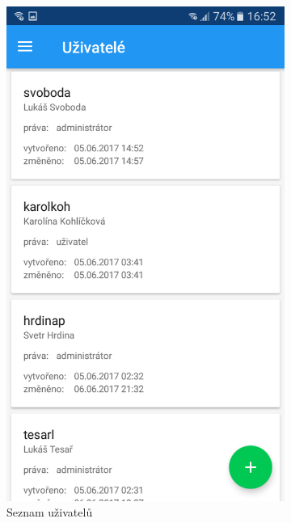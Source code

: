 \documentclass[czech,BP]{thesiskiv}
\begin{document}
\begin{figure}[H]
	\centering
  \begin{subfigure}[b]{0.3\textwidth}
	\centering
	\includegraphics[width=\textwidth]{../images/client_android/Screenshot_20170607-165248.png}	
	\caption{Seznam uživatelů}
	\label{fig:Screenshot_20170607-165248}
  \end{subfigure}
  \begin{subfigure}[b]{0.3\textwidth}
    \centering

\end{subfigure}
\end{figure}
\end{document}
